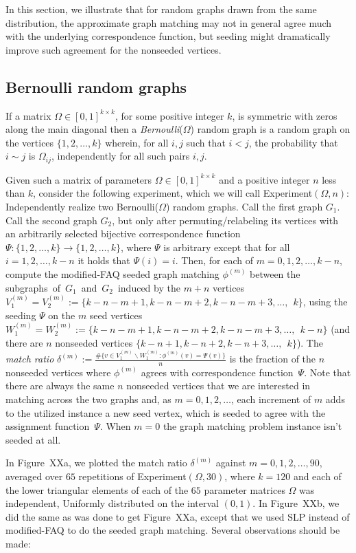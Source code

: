 \documentclass[12pt]{article}
\begin{document}
In this section, we illustrate that for random graphs
drawn from the same distribution, the approximate graph matching
may not in general agree much with the underlying correspondence
function, but seeding might dramatically improve such agreement
for the nonseeded vertices.

\subsection{Bernoulli random graphs}

If a matrix
$\Omega \in [0,1]^{k \times k}$, for some positive
integer $k$, is symmetric with zeros along the
main diagonal then  a {\it Bernoulli}($\Omega$) random
graph is a random graph on the vertices $\{1,2,\ldots,k\}$
wherein, for all $i,j$ such that $i<j$, the probability that
$i \sim j$ is $\Omega_{ij}$, independently for all such pairs $i,j$.

Given such a matrix of parameters
$\Omega \in [0,1]^{k \times k}$ and a positive
integer $n$ less than $k$, consider the following experiment,
which we will call Experiment$(\Omega,n)$:
Independently realize two Bernoulli($\Omega$) random graphs.
Call the first graph $G_1$.
Call the second graph $G_2$, but only after permuting/relabeling its vertices
with an arbitrarily selected bijective correspondence function $\Psi:
\{1,2,\ldots,k \} \rightarrow \{ 1,2,\ldots,k \}$, where $\Psi$ is
arbitrary except that for all $i=1,2,\ldots,k-n$ it holds that
$\Psi(i)=i$. Then, for each of $m=0,1,2,\ldots,k-n$, compute the modified-FAQ seeded
graph matching $\phi^{(m)}$ between the subgraphs~of~$G_1$~and~$G_2$~induced by the
$m+n$ vertices $V_1^{(m)}=V_2^{(m)}:=\{k-n-m+1,k-n-m+2,k-n-m+3,\ldots, \ \ k\}$,
 using the seeding $\Psi$ on the $m$ seed vertices
 $W_1^{(m)}=W_2^{(m)}:=\{k-n-m+1,k-n-m+2,k-n-m+3,\ldots,\ \ k-n\}$
(and there are $n$ nonseeded vertices $\{ k-n+1,k-n+2,k-n+3, \ldots, \ \ k \}$).
The {\it match ratio} $\delta^{(m)}:=\frac{\# \{ v \in V_1^{(m)} \backslash W_1^{(m)}: \phi^{(m)}(v)=\Psi (v)\}}{n} $ is the fraction of the $n$ nonseeded vertices where $\phi^{(m)}$ agrees with correspondence function~$\Psi$. Note that
there are always the same $n$ nonseeded vertices that we
are interested in matching across the two graphs
and, as $m=0,1,2,\ldots$, each increment of $m$ adds
to the utilized instance a new seed vertex, which is seeded to agree with
the assignment function~$\Psi$. When $m=0$ the graph matching
problem instance isn't seeded at all.

In Figure~XXa, we plotted the match ratio $\delta^{(m)}$ against
$m=0,1,2,\ldots,90$, averaged over $65$ repetitions of  Experiment$(\Omega,30)$, where
$k=120$ and each of the lower triangular elements of each of the $65$ parameter
matrices $\Omega$ was independent, Uniformly distributed on
the interval $(0,1)$. In Figure~XXb, we did the same as was done to get
Figure~XXa, except that we used SLP instead of modified-FAQ to do the
seeded graph matching. Several observations should be made:
\end{document}
